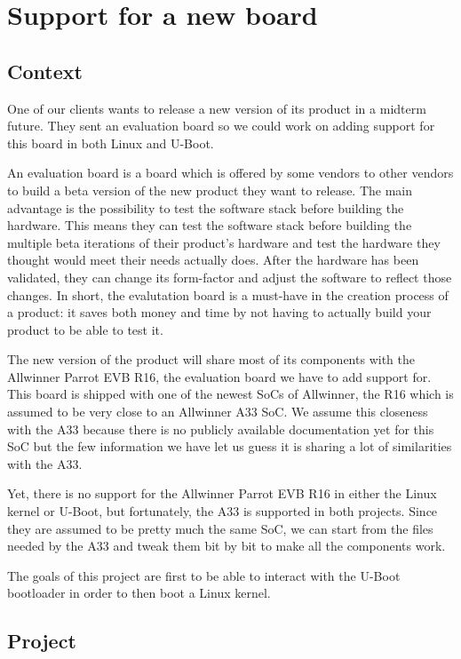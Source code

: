 \chapter{Support for a new board}

\section{Context}
One of our clients wants to release a new version of its product in a midterm future. They sent an evaluation board so we could work on adding support for this board in both Linux and U-Boot.

An evaluation board is a board which is offered by some vendors to other vendors to build a beta version of the new product they want to release. The main advantage is the possibility to test the software stack before building the hardware. This means they can test the software stack before building the multiple beta iterations of their product's hardware and test the hardware they thought would meet their needs actually does. After the hardware has been validated, they can change its form-factor and adjust the software to reflect those changes. In short, the evalutation board is a must-have in the creation process of a product: it saves both money and time by not having to actually build your product to be able to test it.

The new version of the product will share most of its components with the Allwinner Parrot EVB R16, the evaluation board we have to add support for. This board is shipped with one of the newest SoCs of Allwinner, the R16 which is assumed to be very close to an Allwinner A33 SoC. We assume this closeness with the A33 because there is no publicly available documentation yet for this SoC but the few information we have let us guess it is sharing a lot of similarities with the A33.

Yet, there is no support for the Allwinner Parrot EVB R16 in either the Linux kernel or U-Boot, but fortunately, the A33 is supported in both projects. Since they are assumed to be pretty much the same SoC, we can start from the files needed by the A33 and tweak them bit by bit to make all the components work.

The goals of this project are first to be able to interact with the U-Boot bootloader in order to then boot a Linux kernel.

\section{Project}

